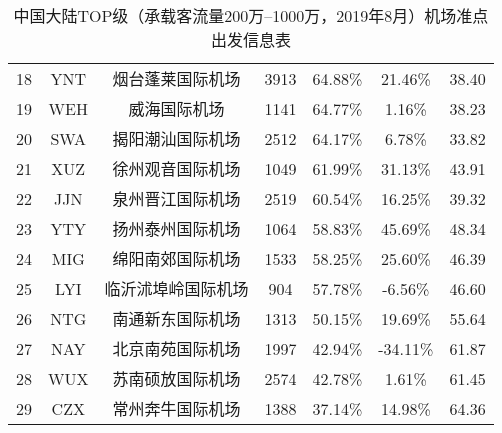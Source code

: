 \begin{table}
{\begin{tabular}{ccccccc}
            18 & YNT & 烟台蓬莱国际机场 & 3913 & 64.88\% & 21.46\% & 38.40 \\
            \rowcolor[HTML]{EFEFEF}
            19 & WEH & 威海国际机场 & 1141 & 64.77\% & 1.16\% & 38.23 \\
            20 & SWA & 揭阳潮汕国际机场 & 2512 & 64.17\% & 6.78\% & 33.82 \\
            \rowcolor[HTML]{EFEFEF}
            21 & XUZ & 徐州观音国际机场 & 1049 & 61.99\% & 31.13\% & 43.91 \\
            22 & JJN & 泉州晋江国际机场 & 2519 & 60.54\% & 16.25\% & 39.32 \\
            \rowcolor[HTML]{EFEFEF}
            23 & YTY & 扬州泰州国际机场 & 1064 & 58.83\% & 45.69\% & 48.34 \\
            24 & MIG & 绵阳南郊国际机场 & 1533 & 58.25\% & 25.60\% & 46.39 \\
            \rowcolor[HTML]{EFEFEF}
            25 & LYI & 临沂沭埠岭国际机场 & 904 & 57.78\% & -6.56\% & 46.60 \\
            26 & NTG & 南通新东国际机场 & 1313 & 50.15\% & 19.69\% & 55.64 \\
            \rowcolor[HTML]{EFEFEF}
            27 & NAY & 北京南苑国际机场 & 1997 & 42.94\% & -34.11\% & 61.87 \\
            28 & WUX & 苏南硕放国际机场 & 2574 & 42.78\% & 1.61\% & 61.45 \\
            \rowcolor[HTML]{EFEFEF}
            29 & CZX & 常州奔牛国际机场 & 1388 & 37.14\% & 14.98\% & 64.36 \\ \hline
        \end{tabular}%
    }
    \caption{中国大陆TOP级（承载客流量200万--1000万，2019年8月）机场准点出发信息表}\label{T:depart_1_3}
\end{table}

